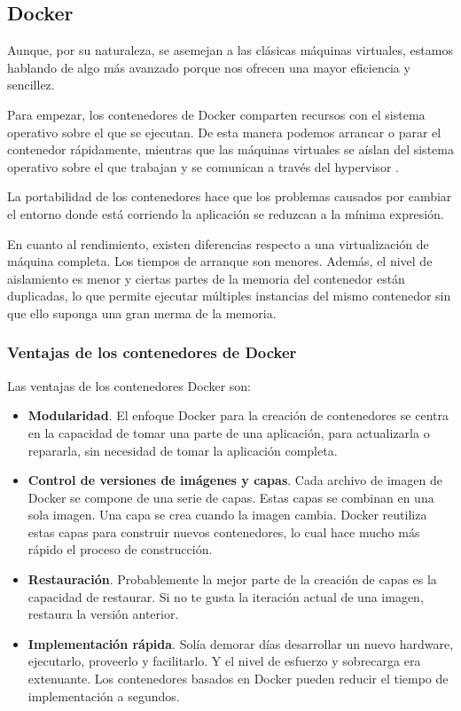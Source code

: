 \subsection{Docker}

Aunque, por su naturaleza, se asemejan a las clásicas máquinas virtuales, estamos hablando de algo más avanzado porque nos ofrecen una mayor eficiencia y sencillez.

Para empezar, los contenedores de Docker comparten recursos con el sistema operativo sobre el que se ejecutan. De esta manera podemos arrancar o parar el contenedor rápidamente, mientras que las máquinas virtuales se aíslan del sistema operativo sobre el que trabajan y se comunican a través del hypervisor \cite{docker2}.

La portabilidad de los contenedores hace que los problemas causados por cambiar el entorno donde está corriendo la aplicación se reduzcan a la mínima expresión.

En cuanto al rendimiento, existen diferencias respecto a una virtualización de máquina completa. Los tiempos de arranque son menores. Además, el nivel de aislamiento es menor y ciertas partes de la memoria del contenedor están duplicadas, lo que permite ejecutar múltiples instancias del mismo contenedor sin que ello suponga una gran merma de la memoria.

\subsubsection{Ventajas de los contenedores de Docker}

Las ventajas de los contenedores Docker son:

\begin{itemize}
  \item \textbf{Modularidad}. El enfoque Docker para la creación de contenedores se centra en la capacidad de tomar una parte de una aplicación, para actualizarla o repararla, sin necesidad de tomar la aplicación completa.
  \item \textbf{Control de versiones de imágenes y capas}. Cada archivo de imagen de Docker se compone de una serie de capas. Estas capas se combinan en una sola imagen. Una capa se crea cuando la imagen cambia. Docker reutiliza estas capas para construir nuevos contenedores, lo cual hace mucho más rápido el proceso de construcción.
  \item \textbf{Restauración}. Probablemente la mejor parte de la creación de capas es la capacidad de restaurar. Si no te gusta la iteración actual de una imagen, restaura la versión anterior.
  \item \textbf{Implementación rápida}. Solía demorar días desarrollar un nuevo hardware, ejecutarlo, proveerlo y facilitarlo. Y el nivel de esfuerzo y sobrecarga era extenuante. Los contenedores basados en Docker pueden reducir el tiempo de implementación a segundos.
\end{itemize}


